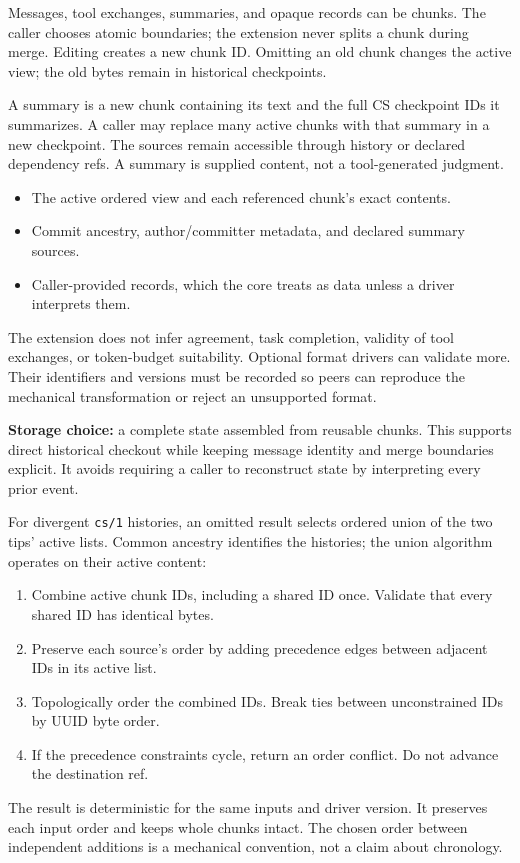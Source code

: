 \documentclass[11pt,letterpaper]{article}
\newcommand{\sect}[1]{\vspace{5pt}{\large\bfseries\textcolor{ink}{#1}}\par\vspace{1pt}}
\newcommand{\subsect}[1]{\vspace{3pt}{\bfseries\textcolor{ink}{#1}}\par}
\newcommand{\code}[1]{{\small\texttt{#1}}}
\newcommand{\note}[1]{\begingroup\setlength{\fboxsep}{9pt}\colorbox{soft}{\parbox{\dimexpr\linewidth-18pt\relax}{#1}}\endgroup\par}
\begin{document}
Messages, tool exchanges, summaries, and opaque records can be chunks. The
caller chooses atomic boundaries; the extension never splits a chunk during
merge. Editing creates a new chunk ID. Omitting an old chunk changes the active
view; the old bytes remain in historical checkpoints.

\subsect{Summaries change the active view}
A summary is a new chunk containing its text and the full CS checkpoint IDs
it summarizes. A caller may replace many active chunks with that summary in
a new checkpoint. The sources remain accessible through history or declared
dependency refs. A summary is supplied content, not a tool-generated judgment.

\subsect{What is versioned?}
\begin{itemize}
\item The active ordered view and each referenced chunk's exact contents.
\item Commit ancestry, author/committer metadata, and declared summary sources.
\item Caller-provided records, which the core treats as data unless a driver interprets them.
\end{itemize}
The extension does not infer agreement, task completion, validity of tool
exchanges, or token-budget suitability. Optional format drivers can validate
more. Their identifiers and versions must be recorded so peers can reproduce
the mechanical transformation or reject an unsupported format.

\note{\textbf{Storage choice:} a complete state assembled from reusable chunks.
This supports direct historical checkout while keeping message identity and
merge boundaries explicit. It avoids requiring a caller to reconstruct state
by interpreting every prior event.}

\newpage
\sect{3. Merge, replay, and concurrent writers}
\subsect{Default merge: ordered union}
For divergent \code{cs/1} histories, an omitted result selects ordered union
of the two tips' active lists. Common ancestry identifies the histories;
the union algorithm operates on their active content:
\begin{enumerate}
\item Combine active chunk IDs, including a shared ID once. Validate that every shared ID has identical bytes.
\item Preserve each source's order by adding precedence edges between adjacent IDs in its active list.
\item Topologically order the combined IDs. Break ties between unconstrained IDs by UUID byte order.
\item If the precedence constraints cycle, return an order conflict. Do not advance the destination ref.
\end{enumerate}
The result is deterministic for the same inputs and driver version. It preserves
each input order and keeps whole chunks intact. The chosen order between
independent additions is a mechanical convention, not a claim about chronology.
\end{document}

